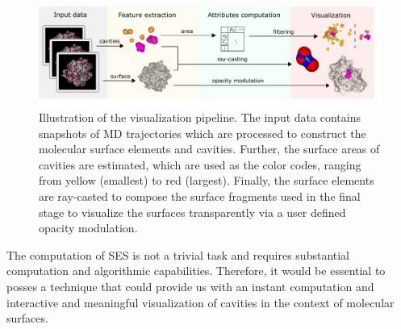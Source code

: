 \begin{figure}[tb]
  \centering
  \includegraphics[width=\textwidth]{image/overview.pdf}
  \caption{Illustration of the visualization pipeline. The input data contains snapshots of MD trajectories which are processed to construct the molecular surface elements and cavities. Further, the surface areas of cavities are estimated, which are used as the color codes, ranging from yellow (smallest) to red (largest). Finally, the surface elements are ray-casted to compose the surface fragments used in the final stage to visualize the surfaces transparently via a user defined opacity modulation.}
	\label{fig:overview}
\end{figure}

The computation of SES is not a trivial task and requires substantial computation and algorithmic capabilities. 
Therefore, it would be essential to posses a technique that could provide us with an instant computation and interactive and meaningful visualization of cavities in the context of molecular surfaces.

